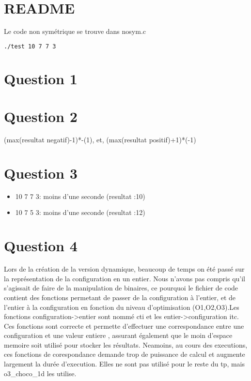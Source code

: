 \documentclass[a4paper,12pt]{report}
\begin{document}
\section*{README}

Le code non symétrique se trouve dans nosym.c\\
\begin{lstlisting}[language=bash]
./test 10 7 7 3
\end{lstlisting}

\section*{Question 1}


\section*{Question 2}
(max(resultat negatif)-1)*-(1), et, (max(resultat positif)+1)*(-1)

\section*{Question 3}
\begin{itemize}
	\item 10 7 7 3: moins d'une seconde (resultat :10)
	\item 10 7 5 3: moins d'une seconde (resultat :12)
\end{itemize}

\section*{Question 4}

Lors de la création de la version dynamique, beaucoup de temps on été passé sur la représentation de la configuration en un entier. Nous n'avons pas compris qu'il s'agissait de faire de la manipulation de binaires, ce pourquoi le fichier de code contient des fonctions permetant de passer de la configuration à l'entier, et de l'entier  à la configuration en fonction du niveau d'optimisation (O1,O2,O3).Les fonctions configuration->entier sont nommé cti et les entier->configuration itc. Ces fonctions sont correcte et permette d'effectuer une correspondance entre une configuration et une valeur entiere , assurant également que le moin d'espace memoire soit utilisé pour stocker les résultats. Neamoins, au cours des executions, ces fonctions de corespondance demande trop de puissance de calcul et augmente largement la durée d'execution. Elles ne sont pas utilisé pour le reste du tp, mais o3_choco_1d les utilise.
\end{document}
